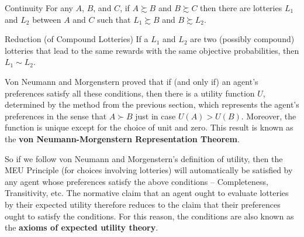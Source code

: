 \vspace{-2mm}
\begin{genericthm}{Continuity}
  For any $A$, $B$, and $C$, if $A \succsim B$ and $B \succsim C$ then
  there are lotteries $L_1$ and $L_2$ between $A$ and $C$ such
  that $L_1 \succsim B$ and $B \succsim L_2$.
\end{genericthm}
\vspace{-2mm}
\begin{genericthm}{Reduction (of Compound Lotteries)}
  If a $L_1$ and $L_2$ are two (possibly compound) lotteries that lead
  to the same rewards with the same objective probabilities, then $L_1
  \sim L_2$.
\end{genericthm}

Von Neumann and Morgenstern proved that if (and only if) an agent's
preferences satisfy all these conditions, then there is a utility
function $U$, determined by the method from the previous section, which
represents the agent's preferences in the sense that $A \succ B$ just
in case $U(A) > U(B)$. Moreover, the function is unique except for the
choice of unit and zero. This result is known as the \textbf{von
  Neumann-Morgenstern Representation Theorem}.


So if we follow von Neumann and Morgenstern's definition of utility,
then the MEU Principle (for choices involving lotteries) will
automatically be satisfied by any agent whose preferences satisfy the
above conditions -- Completeness, Transitivity, etc. The normative
claim that an agent ought to evaluate lotteries by their expected
utility therefore reduces to the claim that their preferences ought to
satisfy the conditions. For this reason, the conditions are also known
as the \textbf{axioms of expected utility theory}.

